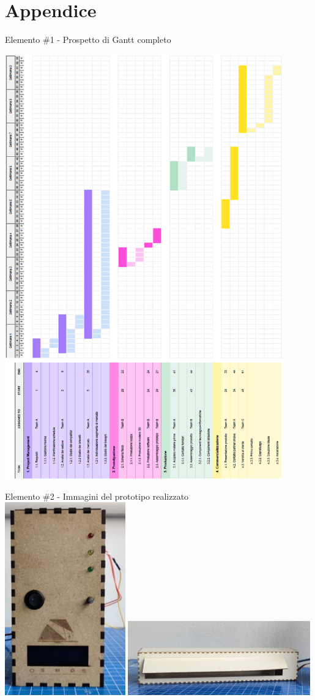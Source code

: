 \documentclass[a4paper, 12pt]{article}
\begin{document}
	\section{Appendice}
	Elemento \#1 - Prospetto di Gantt completo
	\begin{center}
		\includegraphics[width=0.9\textwidth]{Images/gantt_full.png}
	\end{center}
	Elemento \#2 - Immagini del prototipo realizzato\\
	\includegraphics[width=0.39\textwidth]{Images/foto_prototipo1.jpg}
	\includegraphics[width=0.59\textwidth]{Images/foto_prototipo2.jpg}
\end{document}
